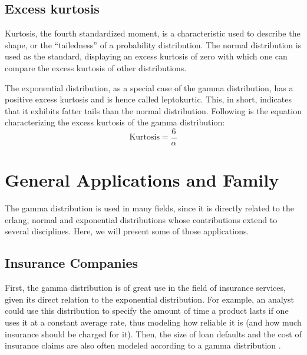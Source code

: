 \documentclass[12pt]{article}
\begin{document}
\subsection{Excess kurtosis}
Kurtosis, the fourth standardized moment, is a characteristic used to describe the shape, or the “tailedness” of a
probability distribution. The normal distribution is used as the standard, displaying an excess kurtosis of zero with
which one can compare the excess kurtosis of other distributions\cite{wikipediaKurtosis2022}.

The exponential distribution, as a special case of the gamma distribution, has a positive excess kurtosis and is hence
called leptokurtic. This, in short, indicates that it exhibits fatter tails than the normal distribution. Following is
the equation characterizing the excess kurtosis of the gamma distribution\cite{wikipediaKurtosis2022}:
\begin{equation}
	\text{Kurtosis} = \frac{6}{\alpha}
\end{equation}


\pagebreak
\section{General Applications and Family}\label{sec:generalApplications}

The gamma distribution is used in many fields, since it is directly related to the erlang, normal and exponential
distributions whose contributions extend to several disciplines. Here, we will present some of those applications.

\subsection{Insurance Companies}
First, the gamma distribution is of great use in the field of insurance services, given its direct relation to the
exponential distribution. For example, an analyst could use this distribution to specify the amount of time a product
lasts if one uses it at a constant average rate, thus modeling how reliable it is (and how much insurance should be
charged for it). Then, the size of loan defaults and the cost of insurance claims are also often modeled according to a
gamma distribution \cite{tiwariModelingInsuranceClaim2020}.
\end{document}
